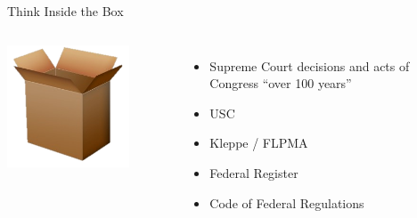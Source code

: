 \begin{frame}{Think Inside the Box}
    \begin{columns}[onlytextwidth]
            \centering
            \includegraphics[width=0.75\textwidth]{img/box.png} \\

            \begin{itemize}
                \item Supreme Court decisions and acts of Congress ``over 100 years''
                \pause
                \item USC
                \pause
                \item Kleppe / FLPMA
                \pause
                \item Federal Register
                \pause
                \item Code of Federal Regulations
            \end{itemize}
    \end{columns}
\end{frame}

